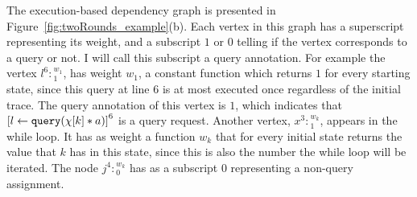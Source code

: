 \begin{example}[twoRounds]
      The execution-based dependency graph is presented in Figure~\ref{fig:twoRounds_example}(b).
      Each vertex in this graph has a superscript representing its weight, and a subscript $1$ or $0$ telling if the vertex corresponds to a query or not. I will call this subscript a query annotation. 
      For example the vertex $l^{6}:{}^{w_1}_1$, 
      has weight $w_1$, a constant function which returns $1$ for every starting state, since 
      this query at line $6$ is at most executed once regardless of the initial trace.
      The query annotation of this vertex is $1$, which  indicates that 
      $\clabel{\assign{l}{\query(\chi[k] * a)}}^6$ is a query request.
      Another vertex, $x^{3}:{}^{w_k}_1$, appears in the while loop. 
      It has as weight a function $w_k$ that for every initial state returns the value that $k$ has in this state, since this is also the number the while loop will be iterated. 
      The node $j^{4}:{}^{w_k}_0$ has as a subscript $0$ representing a non-query assignment.
      

\end{example}
